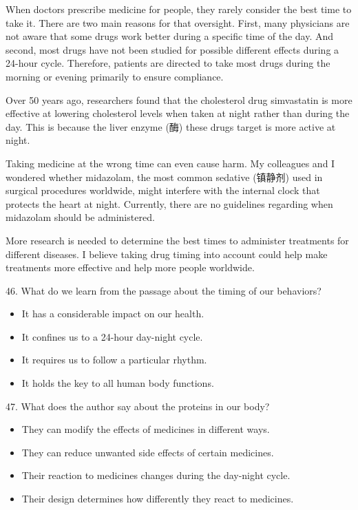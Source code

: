 \documentclass[UTF8,11pt]{ctexart}
\begin{document}
When doctors prescribe medicine for people, they rarely consider the best time to take it. There are two main reasons for that oversight. First, many physicians are not aware that some drugs work better during a specific time of the day. And second, most drugs have not been studied for possible different effects during a 24-hour cycle. Therefore, patients are directed to take most drugs during the morning or evening primarily to ensure compliance.


Over 50 years ago, researchers found that the cholesterol drug simvastatin is more effective at lowering cholesterol levels when taken at night rather than during the day. This is because the liver enzyme (酶) these drugs target is more active at night.


Taking medicine at the wrong time can even cause harm. My colleagues and I wondered whether midazolam, the most common sedative (镇静剂) used in surgical procedures worldwide, might interfere with the internal clock that protects the heart at night. Currently, there are no guidelines regarding when midazolam should be administered.


More research is needed to determine the best times to administer treatments for different diseases. I believe taking drug timing into account could help make treatments more effective and help more people worldwide.


46. What do we learn from the passage about the timing of our behaviors?


\begin{itemize}[leftmargin=2em,itemsep=.2em,topsep=.4em]\item[A.] It has a considerable impact on our health.
\item[B.] It confines us to a 24-hour day-night cycle.
\item[C.] It requires us to follow a particular rhythm.
\item[D.] It holds the key to all human body functions.
\end{itemize}

47. What does the author say about the proteins in our body?


\begin{itemize}[leftmargin=2em,itemsep=.2em,topsep=.4em]\item[A.] They can modify the effects of medicines in different ways.
\item[B.] They can reduce unwanted side effects of certain medicines.
\item[C.] Their reaction to medicines changes during the day-night cycle.
\item[D.] Their design determines how differently they react to medicines.
\end{itemize}
\end{document}
